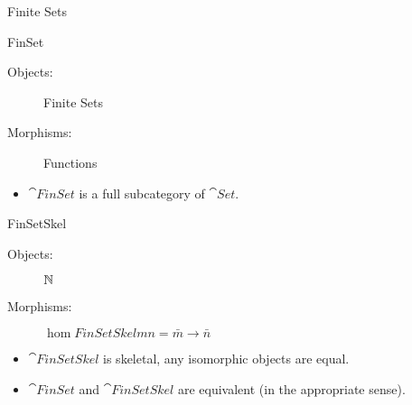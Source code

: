 \documentclass[handout]{beamer}
\begin{document}
\begin{frame}{Finite Sets}

  \begin{block}{FinSet}
    \begin{description}
    \item[Objects:] Finite Sets
    \item[Morphisms:] Functions 
    \end{description}
  \end{block}
  \pause
  \begin{itemize}
  \item $\cat{FinSet}$ is a full subcategory of $\cat{Set}$.
  \end{itemize}
  \pause
  \begin{block}{FinSetSkel}
    \begin{description}
    \item[Objects:] $\mathbb{N}$
    \item[Morphisms:] $\hom{FinSetSkel}{m}{n} = \bar{m} \to \bar{n}$
    \end{description}
  \end{block}
  \pause
  \begin{itemize}
  \item $\cat{FinSetSkel}$ is skeletal, any isomorphic objects are
    equal.
  \item<+-> $\cat{FinSet}$ and $\cat{FinSetSkel}$ are equivalent (in the
    appropriate sense).
  \end{itemize}
  
\end{frame}
\end{document}
